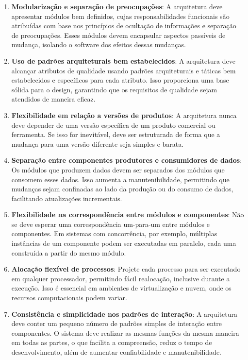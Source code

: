 \begin{enumerate}
    \item \textbf{Modularização e separação de preocupações}: A arquitetura deve apresentar módulos bem definidos, cujas responsabilidades funcionais são atribuídas com base nos princípios de ocultação de informações e separação de preocupações. Esses módulos devem encapsular aspectos passíveis de mudança, isolando o software dos efeitos dessas mudanças.
    
    \item \textbf{Uso de padrões arquiteturais bem estabelecidos}: A arquitetura deve alcançar atributos de qualidade usando padrões arquiteturais e táticas bem estabelecidos e específicos para cada atributo. Isso proporciona uma base sólida para o design, garantindo que os requisitos de qualidade sejam atendidos de maneira eficaz.
    
    \item \textbf{Flexibilidade em relação a versões de produtos}: A arquitetura nunca deve depender de uma versão específica de um produto comercial ou ferramenta. Se isso for inevitável, deve ser estruturada de forma que a mudança para uma versão diferente seja simples e barata.
    
    \item \textbf{Separação entre componentes produtores e consumidores de dados}: Os módulos que produzem dados devem ser separados dos módulos que consomem esses dados. Isso aumenta a manutenibilidade, permitindo que mudanças sejam confinadas ao lado da produção ou do consumo de dados, facilitando atualizações incrementais.
    
    \item \textbf{Flexibilidade na correspondência entre módulos e componentes}: Não se deve esperar uma correspondência um-para-um entre módulos e componentes. Em sistemas com concorrência, por exemplo, múltiplas instâncias de um componente podem ser executadas em paralelo, cada uma construída a partir do mesmo módulo.
    
    \item \textbf{Alocação flexível de processos}: Projete cada processo para ser executado em qualquer processador, permitindo fácil realocação, inclusive durante a execução. Isso é essencial em ambientes de virtualização e nuvem, onde os recursos computacionais podem variar.
    
    \item \textbf{Consistência e simplicidade nos padrões de interação}: A arquitetura deve conter um pequeno número de padrões simples de interação entre componentes. O sistema deve realizar as mesmas funções da mesma maneira em todas as partes, o que facilita a compreensão, reduz o tempo de desenvolvimento, além de aumentar confiabilidade e manutenibilidade.
    

\end{enumerate}
